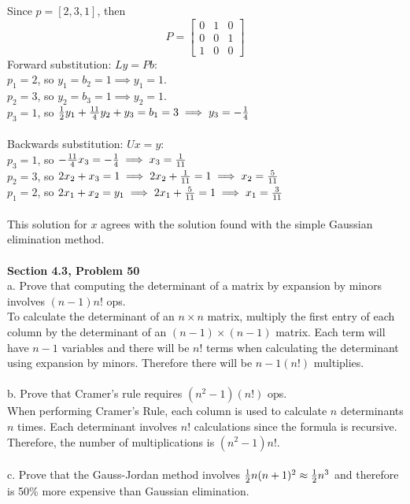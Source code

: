\documentclass[11pt]{article}
\begin{document}
Since $p = [2, 3, 1]$,  then
\[
P = \begin{bmatrix}
0 & 1 & 0 \\
0 & 0 & 1 \\
1 & 0 & 0
\end{bmatrix}
\]
Forward substitution: $Ly = Pb$:\\
$p_1 = 2$, so $y_1 = b_2 = 1 \implies y_1 = 1$.\\
$p_2 = 3$, so $y_2 = b_3 = 1 \implies y_2 = 1$.\\
$p_3 = 1$, so ${1 \over 2}y_1 + {11 \over 4}y_2 + y_3 = b_1 = 3
\implies y_3 = -{1 \over 4}$\\
\\
Backwards substitution: $Ux = y$:\\
$p_3 = 1$, so $-{11 \over 4}x_3 = -{1 \over 4} \implies x_3 = {1 \over 11}$\\
$p_2 = 3$, so $2x_2 + x_3 = 1 \implies 2x_2 + {1 \over 11} = 1
\implies x_2 = {5 \over 11}$\\
$p_1 = 2$, so $2x_1 + x_2 = y_1 \implies 2x_1 + {5 \over 11} = 1
\implies x_1 = {3 \over 11}$\\
\\
This solution for $x$ agrees with the solution found with the simple
Gaussian elimination method.\\
\\
\noindent\textbf{Section 4.3, Problem 50}\\
a. Prove that computing the determinant of a matrix by expansion by minors
involves $(n-1)n!$ ops.\\
To calculate the determinant of an $n \times n$ matrix, 
multiply the first entry of each column by the determinant of an
$(n-1) \times (n-1)$ matrix. Each term will have $n-1$ variables and there
will be $n!$ terms when calculating the determinant using expansion
by minors. Therefore there will be $n-1(n!)$ multiplies.\\
\\
b. Prove that Cramer's rule requires $(n^2 - 1)(n!)$ ops.\\
When performing Cramer's Rule, each column is used to calculate $n$
determinants $n$ times. Each determinant involves $n!$ calculations
since the formula is recursive. Therefore, the number of multiplications 
is $(n^2 -1)n!$.\\
\\
c. Prove that the Gauss-Jordan method involves ${1 \over 2}n(n+1)^2 \approx
{1 \over 2}n^3$ and therefore is 50\% more expensive than Gaussian elimination.\\
\end{document}
